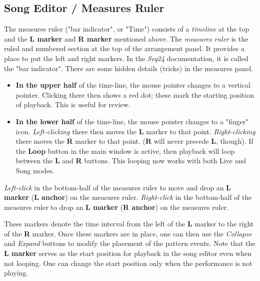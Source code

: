 \subsection{Song Editor / Measures Ruler}
\label{subsec:song_editor_measures_ruler}

   The measures ruler ("bar indicator", or "Time")
   consists of a \textsl{timeline} at the top and the 
   \textbf{L marker} and \textbf{R marker} mentioned above.
   The \textsl{measures ruler} is the ruled and numbered section at the top
   of the arrangement panel.  It provides a place to put the left and right
   markers.  In the \textsl{Seq24} documentation, it is called the "bar
   indicator".
   There are some hidden details (tricks) in the measures panel.

   \begin{itemize}
      \item \textbf{In the upper half} of the time-line,
         the mouse pointer changes to a vertical pointer.
         Clicking there then shows a red dot; these mark
         the starting position of playback.
         This is useful for review.
      \item \textbf{In the lower half} of the time-line,
         the mouse pointer changes to a "finger" icon.
         \textsl{Left-clicking} there then moves the \textbf{L}
         marker to that point.
         \textsl{Right-clicking} there moves the \textbf{R} marker to that point.
         (\textbf{R} will never precede \textbf{L}, though).
         If the \textbf{Loop} button in the main window is active, then
         playback will loop between the \textbf{L} and \textbf{R} buttons.
         This looping now works with both Live and Song modes.
   \end{itemize}

   \textsl{Left-click} in the bottom-half of the
   measures ruler to move and drop an
   \textbf{L marker} (\textbf{L anchor}) on the measures ruler.
   \textsl{Right-click} in the bottom-half of the measures ruler to drop an
   \textbf{L marker} (\textbf{R anchor}) on the measures ruler.
   
   These markers denote the time interval from the left of the 
   \textbf{L} marker to the right of the \textbf{R} marker.
   Once these markers are in place, one can then use
   the \textsl{Collapse} and \textsl{Expand} buttons to modify the
   placement of the pattern events.
   Note that the \textbf{L marker} serves as the start position for playback
   in the song editor even when not looping.
   One can change the start position only when the
   performance is not playing.

